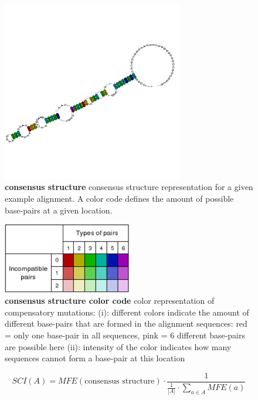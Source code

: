\documentclass[ twoside,openright,titlepage,numbers=noenddot,headinclude,%
                footinclude=false, cleardoublepage=empty,abstractoff, %
                BCOR=5mm,paper=a4,fontsize=11pt,%
                ngerman,american,%
                ]{scrreprt}
\begin{document}
\begin{figure}[ht] 
\centering
\includegraphics[width=0.7\textwidth]{./pictures/consensusStructure/SRP.pdf}
\caption{{\bf consensus structure}
consensus structure representation for a given example alignment.
A color code defines the amount of possible base-pairs at a given location.
}
\label{fig:consensusStructure_example}
\end{figure}

\begin{figure}[ht] 
\centering
\includegraphics[width=0.5\textwidth]{./pictures/consensusStructure/colorcode.pdf}
\caption{{\bf consensus structure color code}
color representation of compensatory mutations: 
(i): different colors indicate the amount of different base-pairs that are formed in the alignment sequences: red = only one base-pair in all sequences, pink = 6 different base-pairs are possible here
(ii): intensity of the color indicates how many sequences cannot form a base-pair at this location
}

\label{fig:colorCode}
\end{figure}




\begin{equation}
SCI(A) = MFE(\mbox{consensus structure}) \cdot \frac{1}{\frac{1}{|A|}\cdot \sum\limits_{a\in A} MFE(a)}
\label{structure conservation index}
\end{equation}
\end{document}
